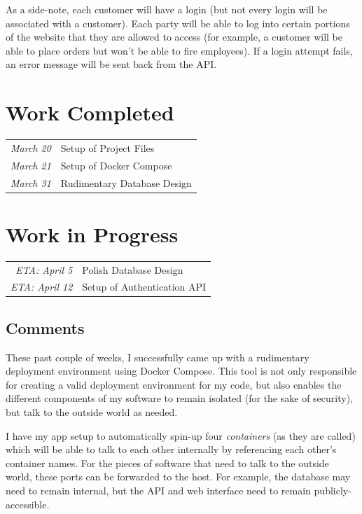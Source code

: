 \documentclass[letterpaper,11pt]{../../templates/texMemo}
\newenvironment{notebox}
{\begin{tcolorbox}[colback=blue!5!white,colframe=blue!75!black,title={\faIcon{info-circle}\hspace{2.5mm}\textbf{Note:}}]}
{\end{tcolorbox}}
\begin{document}
    \begin{notebox}
        As a side-note, each customer will have a login (but not every login will be associated with a customer). Each party will be able to log into certain portions of the website that they are allowed to access (for example, a customer will be able to place orders but won't be able to fire employees). If a login attempt fails, an error message will be sent back from the API.
    \end{notebox}


    \section{Work Completed}
    \begin{tabular}{|r l|}
        \hline
        \emph{March 20} & Setup of Project Files      \\
        \emph{March 21} & Setup of Docker Compose     \\
        \emph{March 31} & Rudimentary Database Design \\
        \hline
    \end{tabular}


    \section{Work in Progress}

    \begin{tabular}{|r l|}
        \hline
        \emph{ETA: April 5}  & Polish Database Design      \\
        \emph{ETA: April 12} & Setup of Authentication API \\
        \hline
    \end{tabular}

    \subsection{Comments}
    These past couple of weeks, I successfully came up with a rudimentary deployment environment using Docker Compose. This tool is not only responsible for creating a valid deployment environment for my code, but also enables the different components of my software to remain isolated (for the sake of security), but talk to the outside world as needed.

    I have my app setup to automatically spin-up four \textit{containers} (as they are called) which will be able to talk to each other internally by referencing each other's container names. For the pieces of software that need to talk to the outside world, these ports can be forwarded to the host. For example, the database may need to remain internal, but the API and web interface need to remain publicly-accessible.
\end{document}
